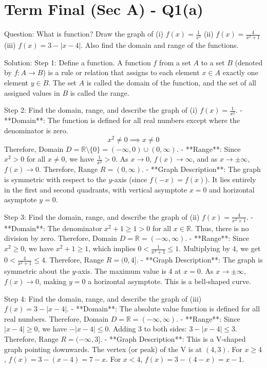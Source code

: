 \documentclass[11pt, a4paper]{article}
\begin{document}

\section*{Term Final (Sec A) - Q1(a)}
Question:
What is function? Draw the graph of
(i) $f(x) = \frac{1}{x^2}$
(ii) $f(x) = \frac{4}{x^2+1}$
(iii) $f(x) = 3 - |x - 4|$.
Also find the domain and range of the functions.

Solution:
Step 1: Define a function.
A function $f$ from a set $A$ to a set $B$ (denoted by $f: A \to B$) is a rule or relation that assigns to each element $x \in A$ exactly one element $y \in B$. The set $A$ is called the domain of the function, and the set of all assigned values in $B$ is called the range.

Step 2: Find the domain, range, and describe the graph of (i) $f(x) = \frac{1}{x^2}$.
- **Domain**: The function is defined for all real numbers except where the denominator is zero.
  $$x^2 \neq 0 \implies x \neq 0$$
  Therefore, Domain $D = \mathbb{R} \setminus \{0\} = (-\infty, 0) \cup (0, \infty)$.
- **Range**: Since $x^2 > 0$ for all $x \neq 0$, we have $\frac{1}{x^2} > 0$. As $x \to 0$, $f(x) \to \infty$, and as $x \to \pm\infty$, $f(x) \to 0$.
  Therefore, Range $R = (0, \infty)$.
- **Graph Description**: The graph is symmetric with respect to the $y$-axis (since $f(-x) = f(x)$). It lies entirely in the first and second quadrants, with vertical asymptote $x = 0$ and horizontal asymptote $y = 0$.

Step 3: Find the domain, range, and describe the graph of (ii) $f(x) = \frac{4}{x^2+1}$.
- **Domain**: The denominator $x^2 + 1 \ge 1 > 0$ for all $x \in \mathbb{R}$. Thus, there is no division by zero.
  Therefore, Domain $D = \mathbb{R} = (-\infty, \infty)$.
- **Range**: Since $x^2 \ge 0$, we have $x^2 + 1 \ge 1$, which implies $0 < \frac{1}{x^2+1} \le 1$.
  Multiplying by 4, we get $0 < \frac{4}{x^2+1} \le 4$.
  Therefore, Range $R = (0, 4]$.
- **Graph Description**: The graph is symmetric about the $y$-axis. The maximum value is 4 at $x = 0$. As $x \to \pm\infty$, $f(x) \to 0$, making $y = 0$ a horizontal asymptote. This is a bell-shaped curve.

Step 4: Find the domain, range, and describe the graph of (iii) $f(x) = 3 - |x - 4|$.
- **Domain**: The absolute value function is defined for all real numbers.
  Therefore, Domain $D = \mathbb{R} = (-\infty, \infty)$.
- **Range**: Since $|x - 4| \ge 0$, we have $-|x - 4| \le 0$.
  Adding 3 to both sides: $3 - |x - 4| \le 3$.
  Therefore, Range $R = (-\infty, 3]$.
- **Graph Description**: This is a V-shaped graph pointing downwards. The vertex (or peak) of the V is at $(4, 3)$. For $x \ge 4$, $f(x) = 3 - (x - 4) = 7 - x$. For $x < 4$, $f(x) = 3 - (4 - x) = x - 1$.
\end{document}
